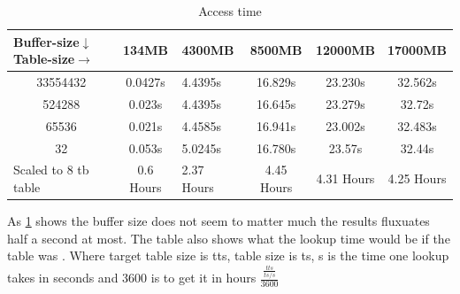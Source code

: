 \begin{table}[H]
\centering
\caption{Access time}
\label{tab:memory}
\begin{tabular}{|c|clccc}
\hline
\multicolumn{1}{|l|}{Buffer-size$\downarrow$ Table-size$\rightarrow$}& \multicolumn{1}{c|}{134MB} & \multicolumn{1}{l|}{4300MB} & \multicolumn{1}{c|}{8500MB} & \multicolumn{1}{c|}{12000MB} & \multicolumn{1}{l|}{17000MB} \\ \hline
33554432                                     & 0.0427s                    & 4.4395s                     & 16.829s                     & 23.230s                      & 32.562s                      \\ \cline{1-1}
524288                                       & 0.023s                     & 4.4395s                     & 16.645s                     & 23.279s                      & 32.72s                       \\ \cline{1-1}
65536                                        & 0.021s                     & 4.4585s                     & 16.941s                     & 23.002s                      & 32.483s                      \\ \cline{1-1}
32                                           & 0.053s                     & 5.0245s                     & 16.780s                     & 23.57s                       & 32.44s                       \\ \cline{1-1}
\multicolumn{1}{|l|}{Scaled to 8 tb table}   & 0.6 Hours                  & 2.37 Hours                  & 4.45 Hours                   & 4.31 Hours                   & 4.25 Hours                   \\ \cline{1-1}
\end{tabular}
\end{table}
As \ref{tab:memory} shows the buffer size does not seem to matter much the results fluxuates half a second at most.
The table also shows what the lookup time would be if the table was . Where target table size is tts, table size is ts, s is the time one lookup takes in seconds and 3600 is to get it in hours $\frac{\frac{tts}{ts/s}}{3600}$
